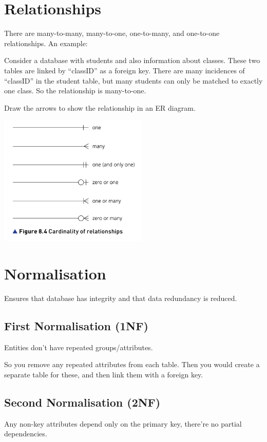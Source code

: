 \documentclass{article}
\theoremstyle{mytheoremstyle}
\theoremstyle{mytheoremstyle}
\theoremstyle{myproblemstyle}
\begin{document}
    \section{Relationships}
    There are many-to-many, many-to-one, one-to-many, and one-to-one relationships. An example:

    Consider a database with students and also information about classes. These two tables are linked by ``classID'' as a foreign key. There are many incidences of ``classID'' in the student table, but many students can only be matched to exactly one class. So the relationship is many-to-one.

    Draw the arrows to show the relationship in an ER diagram. 

    \begin{center}
        \includegraphics[width=200pt]{image.png}
    \end{center}
    

    \section{Normalisation}

    Ensures that database has integrity and that data redundancy is reduced. 

    \subsection{First Normalisation (1NF)}
    Entities don't have repeated groups/attributes.

    So you remove any repeated attributes from each table. Then you would create a separate table for these, and then link them with a foreign key. 

    \subsection{Second Normalisation (2NF)}
    Any non-key attributes depend only on the primary key, there're no partial dependencies.
\end{document}
